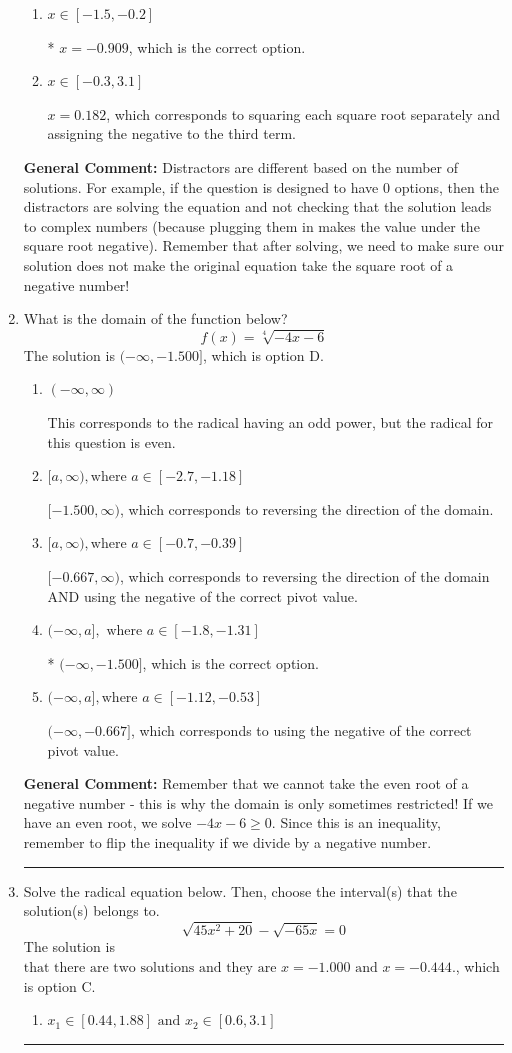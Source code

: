 \documentclass{extbook}[14pt]
\newcommand{\litem}[1]{\item #1

\rule{\textwidth}{0.4pt}}
\begin{document}
\begin{enumerate}
{\begin{enumerate}[label=\Alph*.]
This corresponds to believing the solution $x = -0.909$ leads to a complex value in the original equation.
\item \( x \in [-1.5,-0.2] \)

* $x = -0.909$, which is the correct option.
\item \( x \in [-0.3,3.1] \)

$x = 0.182$, which corresponds to squaring each square root separately and assigning the negative to the third term.
\end{enumerate}

\textbf{General Comment:} Distractors are different based on the number of solutions. For example, if the question is designed to have 0 options, then the distractors are solving the equation and not checking that the solution leads to complex numbers (because plugging them in makes the value under the square root negative). Remember that after solving, we need to make sure our solution does not make the original equation take the square root of a negative number!
}
\litem{
What is the domain of the function below?
\[ f(x) = \sqrt[4]{-4 x - 6} \]The solution is \( (-\infty, -1.500] \), which is option D.\begin{enumerate}[label=\Alph*.]
\item \( (-\infty, \infty) \)

This corresponds to the radical having an odd power, but the radical for this question is even.
\item \( [a, \infty), \text{where } a \in [-2.7, -1.18] \)

 $[-1.500, \infty)$, which corresponds to reversing the direction of the domain.
\item \( [a, \infty), \text{where } a \in [-0.7, -0.39] \)

$[-0.667, \infty)$, which corresponds to reversing the direction of the domain AND using the negative of the correct pivot value.
\item \( (-\infty, a], \text{ where } a \in [-1.8, -1.31] \)

* $(-\infty, -1.500]$, which is the correct option.
\item \( (-\infty, a], \text{where } a \in [-1.12, -0.53] \)

$(-\infty, -0.667]$, which corresponds to using the negative of the correct pivot value.
\end{enumerate}

\textbf{General Comment:} Remember that we cannot take the even root of a negative number - this is why the domain is only sometimes restricted! If we have an even root, we solve $-4 x - 6 \geq 0$. Since this is an inequality, remember to flip the inequality if we divide by a negative number.
}
\litem{
Solve the radical equation below. Then, choose the interval(s) that the solution(s) belongs to.
\[ \sqrt{45 x^2 + 20} - \sqrt{-65 x} = 0 \]The solution is \( \text{that there are two solutions and they are } x = -1.000 \text{ and } x = -0.444. \), which is option C.\begin{enumerate}[label=\Alph*.]
\item \( x_1 \in [0.44, 1.88] \text{ and } x_2 \in [0.6,3.1] \)


\end{enumerate}}
\end{enumerate}
\end{document}
